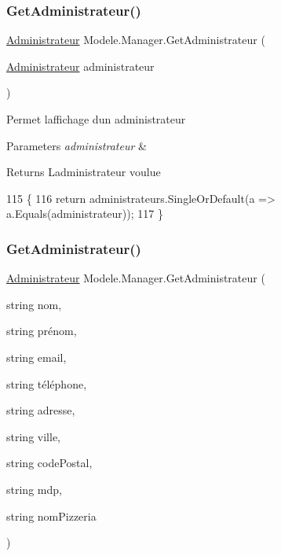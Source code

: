 \subsubsection{\texorpdfstring{Get\+Administrateur()}{GetAdministrateur()}\hspace{0.1cm}{\footnotesize\ttfamily [1/2]}}
{\footnotesize\ttfamily \hyperlink{classModele_1_1Administrateur}{Administrateur} Modele.\+Manager.\+Get\+Administrateur (\begin{DoxyParamCaption}\item[{\hyperlink{classModele_1_1Administrateur}{Administrateur}}]{administrateur }\end{DoxyParamCaption})\hspace{0.3cm}{\ttfamily [inline]}}



Permet l\textquotesingle{}affichage d\textquotesingle{}un administrateur 


\begin{DoxyParams}{Parameters}
{\em administrateur} & \\
\hline
\end{DoxyParams}
\begin{DoxyReturn}{Returns}
L\textquotesingle{}administrateur voulue
\end{DoxyReturn}

\begin{DoxyCode}
115         \{
116             \textcolor{keywordflow}{return} administrateurs.SingleOrDefault(a => a.Equals(administrateur));
117         \}
\end{DoxyCode}
\mbox{\label{classModele_1_1Manager_a013250c8b389540f4ed1683a00354118}} 
\subsubsection{\texorpdfstring{Get\+Administrateur()}{GetAdministrateur()}\hspace{0.1cm}{\footnotesize\ttfamily [2/2]}}
{\footnotesize\ttfamily \hyperlink{classModele_1_1Administrateur}{Administrateur} Modele.\+Manager.\+Get\+Administrateur (\begin{DoxyParamCaption}\item[{string}]{nom,  }\item[{string}]{prénom,  }\item[{string}]{email,  }\item[{string}]{téléphone,  }\item[{string}]{adresse,  }\item[{string}]{ville,  }\item[{string}]{code\+Postal,  }\item[{string}]{mdp,  }\item[{string}]{nom\+Pizzeria }\end{DoxyParamCaption})\hspace{0.3cm}{\ttfamily [inline]}}



